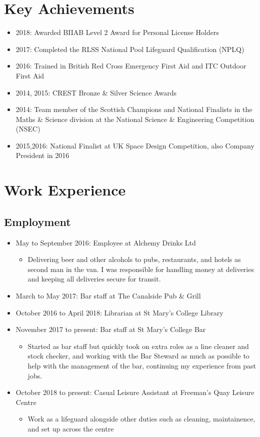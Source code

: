 \documentclass[10pt, a4paper]{article}
\begin{document}
\section{Key Achievements}
\begin{itemize}
    \item 2018: Awarded BIIAB Level 2 Award for Personal License Holders
	\item 2017: Completed the RLSS National Pool Lifeguard Qualification (NPLQ)
	\item 2016: Trained in British Red Cross Emergency First Aid and ITC Outdoor First Aid
	\item 2014, 2015: CREST Bronze \& Silver Science Awards
	\item 2014: Team member of the Scottish Champions and National Finalists in the Maths \& Science division at the National Science \& Engineering Competition (NSEC)
	\item 2015,2016: National Finalist at UK Space Design Competition, also Company President in 2016
\end{itemize}

\section{Work Experience}
	\subsection{Employment}
	\begin{itemize}
		\item May to September 2016: Employee at Alchemy Drinks Ltd
		\begin{itemize}
			\item Delivering beer and other alcohols to pubs, restaurants, and hotels as second man in the van. I was responsible for handling money at deliveries and keeping all deliveries secure for transit. 
		\end{itemize}
		\item March to May 2017: Bar staff at The Canalside Pub \& Grill
		\item October 2016 to April 2018: Librarian at St Mary's College Library
		\item November 2017 to present: Bar staff at St Mary's College Bar
    		\begin{itemize}
    			\item Started as bar staff but quickly took on extra roles as a line cleaner and stock checker, and working with the Bar Steward as much as possible to help with the management of the bar, continuing my experience from past jobs.
    		\end{itemize}
        \item October 2018 to present: Casual Leisure Assistant at Freeman's Quay Leisure Centre
            \begin{itemize}
                \item Work as a lifeguard alongside other duties such as cleaning, maintainence, and set up across the centre
            \end{itemize}
	\end{itemize}
\end{document}
